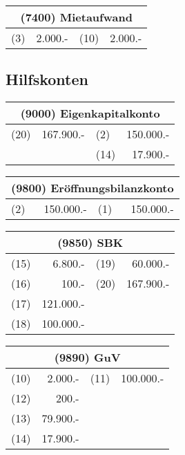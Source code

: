 \documentclass[parskip=half,12pt,a4paper]{scrartcl}
\begin{document}
\begin{center}
	\begin{tabular}{lr|lr}
		\multicolumn{4}{c}{(7400) Mietaufwand}\\
		\toprule
		(3) & 2.000.- & (10) & 2.000.-\\
		\bottomrule
	\end{tabular}
\end{center}

\subsection{Hilfskonten}

\begin{center}
\begin{tabular}{lr|lr}
	\multicolumn{4}{c}{(9000) Eigenkapitalkonto}\\
	\toprule
	(20) & 167.900.- & (2) & 150.000.-\\
	& & (14) & 17.900.-\\
	\bottomrule
\end{tabular}
\end{center}

\begin{center}
\begin{tabular}{lr|lr}
\multicolumn{4}{c}{(9800) Eröffnungsbilanzkonto}\\
\toprule
(2) & 150.000.- & (1) & 150.000.-\\
\end{tabular}
\end{center}

\begin{center}
\begin{tabular}{lr|lr}
\multicolumn{4}{c}{(9850) SBK}\\
\toprule
(15) & 6.800.- & (19) & 60.000.-\\
(16) & 100.- & (20) & 167.900.-\\
(17) & 121.000.- & &\\
(18) & 100.000.- & &\\
\bottomrule
\end{tabular}
\end{center}

\begin{center}
	\begin{tabular}{lr|lr}
		\multicolumn{4}{c}{(9890) GuV}\\
		\toprule
		(10) & 2.000.- & (11) & 100.000.-\\
		(12) & 200.- & &\\
		(13) & 79.900.- & &\\
		(14) & 17.900.- & &\\
		\bottomrule
	\end{tabular}
\end{center}
\end{document}
